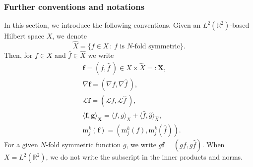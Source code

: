 \documentclass[11pt,reqno,a4paper]{amsart}
\def\RR {\mathbb{R}}
\newcommand{\cL}{\mathcal{L}}
\newcommand{\mrm}{\mathrm{m}}
\newcommand{\1}{\mathbbm{1}}
\theoremstyle{definition}
\theoremstyle{definition}
\numberwithin{equation}{section}
\begin{document}
\subsubsection*{\textbf{Further conventions and notations}}
In this section, we introduce the following conventions. Given an $L^2(\RR^2)$-based Hilbert space $X$, we denote 
\begin{equation}
    \widehat{X}=\{f\in X\, :\, f \text{ is $N$-fold symmetric}\}.
\end{equation}
Then, for $f\in X$ and $\widehat{f}\in \widehat{X}$ we write 
\begin{align}
    \label{vec1}&{\mathbf f}=(f,\widehat{f}\,)\in X\times\widehat{X}=:{\mathbf X}, \\
    \label{vec2}&\nabla{\mathbf f}=(\nabla f,\nabla \widehat{f}\,),\\
    \label{vec3}&\cL{\mathbf f}=(\cL f,\cL\widehat{f}\,),\\
    \label{vec4}&\langle {\mathbf f}, {\mathbf g}\rangle_{\mathbf{X}}=\langle f,g\rangle_{X} +\langle \widehat{f},\widehat{g}\rangle_{\widehat{X}},\\
    \label{vec5}&\mrm^k_j({\mathbf f})=(\mrm^k_j( f),\mrm^k_j({\widehat{f}})).
\end{align}
For  a given $N$-fold symmetric function $g$, we write $g{\mathbf f}=(gf,g\widehat{f})$. When $X=L^2(\RR^2)$, we do not write the subscript in the inner products and norms. 
\end{document}
